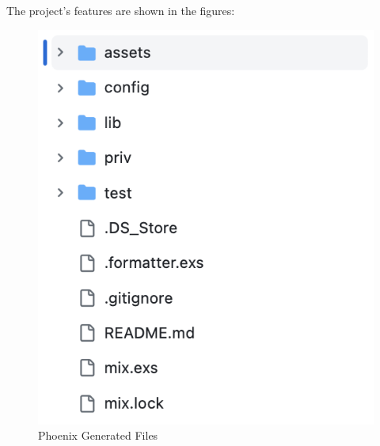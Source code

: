 The project's features are shown in the figures:

\begin{figure}[htbp]
	\centering
	\includegraphics[scale=0.5]{figures/phx-folders.png}  %
	\caption{Phoenix Generated Files}
	\label{fig:phx}
\end{figure}



